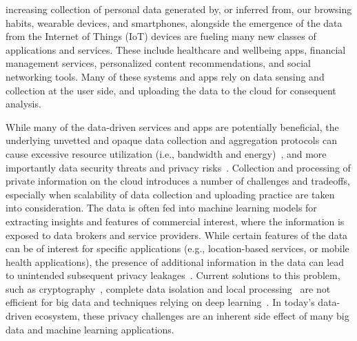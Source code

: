 \documentclass[10pt,journal,compsoc]{IEEEtran}
\newcommand{\alert}[1]{\textcolor{purple}{#1}}
\begin{document}
 increasing collection of personal data generated by, or inferred from, our browsing habits, wearable devices, and smartphones, alongside the emergence of the data from the Internet of Things (IoT) devices are fueling many new classes of applications and services. These include healthcare and wellbeing apps, financial management services, personalized content recommendations, and social networking tools. Many of these systems and apps rely on data sensing and collection at the user side, and uploading the data to the cloud for consequent analysis. 

While many of the data-driven services and apps are potentially beneficial, the underlying unvetted and opaque data collection and aggregation protocols can cause excessive resource utilization (i.e., bandwidth and energy)~\cite{vallina2012breaking}, and more importantly data security threats and privacy risks~\cite{acquisti2015privacy}. Collection and processing of private information on the cloud introduces a number of challenges and tradeoffs, especially when scalability of data collection and uploading practice are taken into consideration. The data is often fed into machine learning models for extracting insights and features of commercial interest, where the information is exposed to data brokers and service providers. While certain features of the data can be of interest for specific applications (e.g., location-based services, or mobile health applications), the presence of additional information in the data can lead to unintended subsequent privacy leakages~\cite{haris2014privacy, haddadi2014quantified}. Current solutions to this problem, such as cryptography~\cite{garcia2010privacy, fontaine2007survey}, complete data isolation and local processing~\cite{garcia2015edge} are not efficient for big data and techniques relying on deep learning~\cite{osia2017}. In today's data-driven ecosystem, these privacy challenges are an inherent side effect of many big data and machine learning applications.

  
\end{document}
